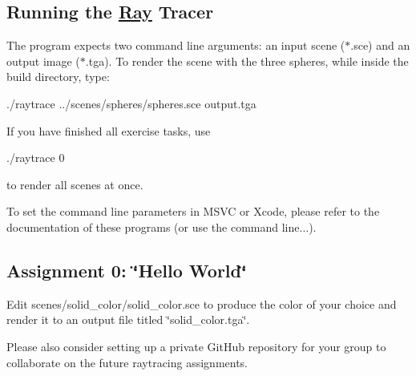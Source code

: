 \subsection*{Running the \hyperlink{classRay}{Ray} Tracer }

The program expects two command line arguments\+: an input scene ({\ttfamily $\ast$.sce}) and an output image ({\ttfamily $\ast$.tga}). To render the scene with the three spheres, while inside the {\ttfamily build} directory, type\+: \begin{DoxyVerb}./raytrace ../scenes/spheres/spheres.sce output.tga
\end{DoxyVerb}


If you have finished all exercise tasks, use \begin{DoxyVerb}./raytrace 0
\end{DoxyVerb}


to render all scenes at once.

To set the command line parameters in M\+S\+VC or Xcode, please refer to the documentation of these programs (or use the command line...).

\subsection*{Assignment 0\+: \char`\"{}\+Hello World\char`\"{} }

Edit scenes/solid\+\_\+color/solid\+\_\+color.\+sce to produce the color of your choice and render it to an output file titled \char`\"{}solid\+\_\+color.\+tga\char`\"{}.

Please also consider setting up a private Git\+Hub repository for your group to collaborate on the future raytracing assignments. 